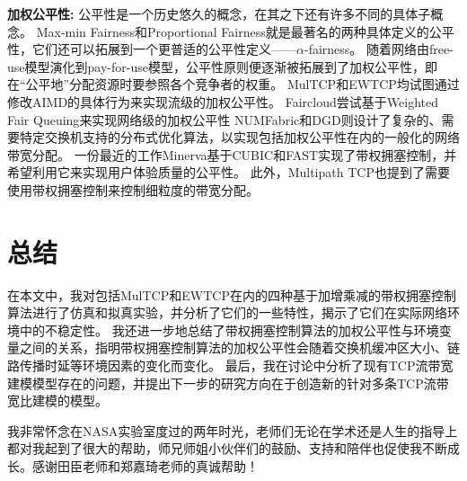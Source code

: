 \documentclass[winfonts]{njuthesis}
\begin{document}
{\bf 加权公平性: }
公平性是一个历史悠久的概念，在其之下还有许多不同的具体子概念。
Max-min Fairness\cite{bertsekas1992data,jaffe1981bottleneck}和Proportional Fairness\cite{kelly1998rate}就是最著名的两种具体定义的公平性，它们还可以拓展到一个更普适的公平性定义——$\alpha$-fairness\cite{mo2000fair}。
随着网络由free-use模型演化到pay-for-use模型，公平性原则便逐渐被拓展到了加权公平性，即在“公平地”分配资源时要参照各个竞争者的权重。
MulTCP\cite{crowcroft1998differentiated}和EWTCP\cite{Honda2009EWTCP}均试图通过修改AIMD的具体行为来实现流级的加权公平性。
Faircloud\cite{popa2012faircloud}尝试基于Weighted Fair Queuing\cite{demers1989analysis,Abhay1993WFQ}来实现网络级的加权公平性
NUMFabric\cite{nagaraj2016numfabric}和DGD\cite{low1999DGD}则设计了复杂的、需要特定交换机支持的分布式优化算法，以实现包括加权公平性在内的一般化的网络带宽分配。
一份最近的工作Minerva\cite{Nathan2019wcubic}基于CUBIC\cite{ha2008cubic}和FAST\cite{chen2004fast}实现了带权拥塞控制，并希望利用它来实现用户体验质量的公平性。
此外，Multipath TCP\cite{wischik2011design,lu2018multi}也提到了需要使用带权拥塞控制来控制细粒度的带宽分配。

\chapter{总结}\label{chapter:conclusion}

在本文中，我对包括MulTCP和EWTCP在内的四种基于加增乘减的带权拥塞控制算法进行了仿真和拟真实验，并分析了它们的一些特性，揭示了它们在实际网络环境中的不稳定性。
我还进一步地总结了带权拥塞控制算法的加权公平性与环境变量之间的关系，指明带权拥塞控制算法的加权公平性会随着交换机缓冲区大小、链路传播时延等环境因素的变化而变化。
最后，我在讨论中分析了现有TCP流带宽建模模型存在的问题，并提出下一步的研究方向在于创造新的针对多条TCP流带宽比建模的模型。



\begin{acknowledgement}
我非常怀念在NASA实验室度过的两年时光，老师们无论在学术还是人生的指导上都对我起到了很大的帮助，师兄师姐小伙伴们的鼓励、支持和陪伴也促使我不断成长。感谢田臣老师和郑嘉琦老师的真诚帮助！
\end{acknowledgement}

\end{document}
